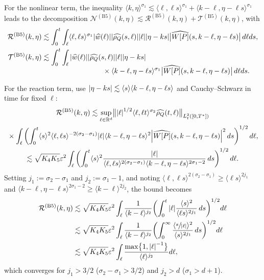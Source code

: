 \documentclass[JEP,XML,SOM,Unicode]{cedram}
\newcommand{\bnorm}[1]{\bigl\|#1\bigr\|}
\newcommand{\babs}[1]{\bigl|#1\bigr|}
\theoremstyle{plain}
\theoremstyle{remark}
\newcommand{\br}[1]{\left(#1\right)}
\newcommand{\bbbr}[1]{\biggl(#1 \biggr)}
\newcommand{\jb}[1]{\langle#1\rangle}
\newcommand{\bset}[1]{\bigl\{#1\bigr\}}
\newcommand{\ep}{\varepsilon}
\newcommand{\R}{\mathbb{R}}
\begin{document}
For the nonlinear term, the inequality $\jb{k,\eta}^{\sigma_1} \lesssim \jb{\ell,\ell s}^{\sigma_1} + \jb{k-\ell,\eta-\ell s}^{\sigma_1}$ leads to the decomposition $\mathcal{N}^{\mathrm{(B5)}}(k,\eta)\lesssim \mathcal{R}^{\mathrm{(B5)}}(k,\eta)+ \mathcal{T}^{\mathrm{(B5)}}(k,\eta)$, with
\begin{align*}
\mathcal{R}^{\mathrm{(B5)}}(k,\eta)&\lesssim\int_0^t\int_\ell \jb{\ell,\ell s}^{\sigma_1}\abs{\widehat{w}(\ell )}\abs{\widehat{\rho_Q}(s,\ell )}\abs{\ell}\abs{\eta-ks}\babs{\widehat{W[P]}(s,k-\ell ,\eta-\ell s)}\,d\ell ds,\\
\mathcal{T}^{\mathrm{(B5)}}(k,\eta)&\lesssim\int_0^t\int_\ell \abs{\widehat{w}(\ell )}\abs{\widehat{\rho_Q}(s,\ell )}\abs{\ell}\abs{\eta-ks}\\[-5pt]
&\hspace{3cm}\times\jb{k-\ell,\eta-\ell s}^{\sigma_1}\babs{\widehat{W[P]}(s,k-\ell ,\eta-\ell s)}\,d\ell ds.
\end{align*}

For the reaction term, use $\abs{\eta-ks} \lesssim \jb{s} \jb{k-\ell,\eta-\ell s}$ and Cauchy–Schwarz in time for fixed $\ell$:
\begin{multline*}
\mathcal{R}^{\mathrm{(B5)}}(k,\eta)\lesssim\sup_{\ell\in\R^d}\bnorm{\abs{\ell}^{1/2}\jb{\ell,\ell t}^{\sigma_2}\widehat{\rho_Q}(t,\ell)}_{L^2_t([0,T^*])}\\
{}\times\int_\ell\br{\int_0^t\jb{s}^2 \jb{\ell,\ell s}^{-2(\sigma_2-\sigma_1)}\abs{\ell}\jb{k-\ell,\eta-\ell s}^2\abs{\widehat{W[P]}(s,k-\ell ,\eta-\ell s)}^2\,ds}^{1/2} d\ell,\\
\lesssim\sqrt{K_4K_5}\ep^2\int_\ell\br{\int_0^t\jb{s}^2\frac{\abs{\ell}}{\jb{\ell,\ell s}^{2(\sigma_2-\sigma_1)}\jb{k-\ell,\eta-\ell s}^{2\sigma_1-2}}\,ds}^{1/2} d\ell.
\end{multline*}
Setting $j_1:=\sigma_2-\sigma_1$ and $j_2:=\sigma_1-1$, and noting $\jb{\ell,\ell s}^{2(\sigma_2-\sigma_1)}\geq \jb{\ell s}^{2j_1}$ and $\jb{k-\ell,\eta-\ell s}^{2\sigma_1-2}\geq \jb{k-\ell}^{2j_2}$, the bound becomes
\begin{align*}\mathcal{R}^{\mathrm{(B5)}}(k,\eta)&\lesssim\sqrt{K_4K_5}\ep^2\int_\ell\frac{1}{\jb{k-\ell}^{j_2}}\bbbr{\int_0^t\abs{\ell}\frac{\jb{s}^2}{\jb{\ell s}^{2j_1}}\,ds}^{1/2} d\ell\\
&\lesssim\sqrt{K_4K_5}\ep^2\int_\ell\frac{1}{\jb{k-\ell}^{j_2}}\bbbr{\int_0^\infty\frac{\jb{\sfrac{s}{\abs{\ell}}}^2}{\jb{s}^{2j_1}}\,ds}^{1/2} d\ell\\
&\lesssim\sqrt{K_4K_5}\ep^2\int_\ell\frac{\max\bset{1,\abs{\ell}^{-1}}}{\jb{\ell}^{j_2}} d\ell,
\end{align*}which converges for $j_1>3/2$ (\ie $\sigma_2-\sigma_1>3/2$) and $j_2>d$ (\ie $\sigma_1>d+1$).
\end{document}
